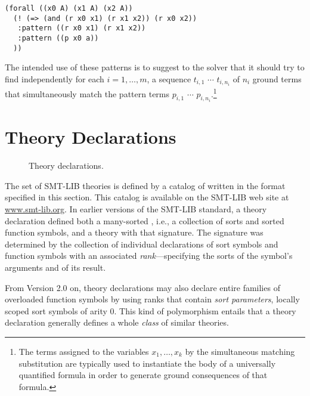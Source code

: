 
\begin{lstlisting}[linewidth=31em]
(forall ((x0 A) (x1 A) (x2 A))
  (! (=> (and (r x0 x1) (r x1 x2)) (r x0 x2))
   :pattern ((r x0 x1) (r x1 x2)) 
   :pattern ((p x0 a)) 
  ))
\end{lstlisting}

The intended use of these patterns is to suggest to the solver that it should
try to find independently
for each $i=1,\ldots,m$, a sequence $t_{i,1}$  $\cdots$ $t_{i,n_i}$ of $n_i$ 
ground terms 
that simultaneously match the pattern terms $p_{i,1}$  $\cdots$ $p_{i,n_i}$.\footnote{%
The terms assigned to the variables $x_1, \ldots, x_k$ by the simultaneous 
matching substitution are typically used to instantiate the body 
of a universally quantified formula in order to generate ground consequences 
of that formula.
}

\section{Theory Declarations} \label{sec:theory-declarations}

\begin{figure}
\cTheories
\caption{Theory declarations.}
\label{fig:theory-decls}
\end{figure}

The set of SMT-LIB theories is defined by a catalog of 
written in the format specified in this section.  
This catalog is available on the SMT-LIB web site at \href{http://www.smt-lib.org}{www.smt-lib.org}.
In earlier versions of the SMT-LIB standard,
a theory declaration defined both a many-sorted ,
i.e., a collection of sorts and sorted function symbols,
and a theory with that signature.
The signature was determined by the collection 
of individual declarations of sort symbols
and function symbols with an associated \emph{rank}---specifying
the sorts of the symbol's arguments and of its result.

From Version 2.0 on, 
theory declarations may also declare entire families 
of overloaded function symbols by using ranks that contain 
\emph{sort parameters}, locally scoped sort symbols of arity 0. 
This kind of polymorphism entails that a theory declaration generally defines 
a whole \emph{class} of similar theories.

